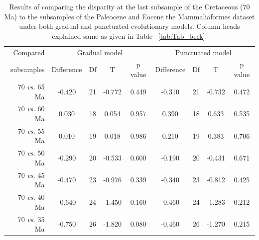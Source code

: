 \documentclass[12pt,letterpaper]{article}
\begin{document}
\begin{table}[ht]
\caption{Results of comparing the disparity at the last subsample of the Cretaceous (70 Ma) to the subsamples of the Paleocene and Eocene the Mammaliaformes dataset under both gradual and punctuated evolutionary models. Column heads explained same as given in Table ~\ref{tab:Tab_beck}.}
\label{tab:Tab_slater}
\centering
\begin{tabular}{r|cccc|cccc}
  \hline
  Compared & \multicolumn{4}{c|}{Gradual model} & \multicolumn{4}{c}{Punctuated model} \\
  subsamples & Difference & Df & T & p value & Difference & Df & T & p value \\ 
  \hline
  70 \textit{vs.} 65 Ma & -0.420 & 21 & -0.772 & 0.449 & -0.310 & 21 & -0.732 & 0.472 \\ 
  70 \textit{vs.} 60 Ma & 0.030 & 18 & 0.054 & 0.957 & 0.390 & 18 & 0.633 & 0.535 \\ 
  70 \textit{vs.} 55 Ma & 0.010 & 19 & 0.018 & 0.986 & 0.210 & 19 & 0.383 & 0.706 \\ 
  70 \textit{vs.} 50 Ma & -0.290 & 20 & -0.533 & 0.600 & -0.190 & 20 & -0.431 & 0.671 \\ 
  70 \textit{vs.} 45 Ma & -0.470 & 23 & -0.976 & 0.339 & -0.340 & 23 & -0.812 & 0.425 \\ 
  70 \textit{vs.} 40 Ma & -0.640 & 24 & -1.450 & 0.160 & -0.460 & 24 & -1.283 & 0.212 \\ 
  70 \textit{vs.} 35 Ma & -0.750 & 26 & -1.820 & 0.080 & -0.460 & 26 & -1.270 & 0.215 \\ 
   \hline
\end{tabular}
\end{table}
\end{document}

